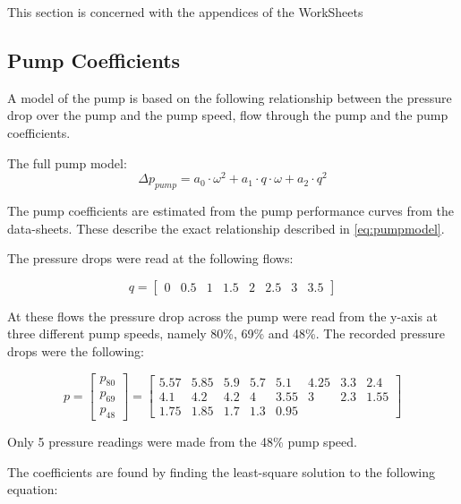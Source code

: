This section is concerned with the appendices of the WorkSheets

\subsection{Pump Coefficients} \label{ap:PumpCoef}

A model of the pump is based on the following relationship between the pressure drop over the pump and the pump speed, flow through the pump and the pump coefficients.

The full pump model:
\begin{equation} \label{eq:pumpmodel}
		\Delta p_{pump}  = a_0  \cdot \omega^2 + a_1 \cdot q \cdot \omega + a_2 \cdot q^2
\end{equation}

The pump coefficients are estimated from the pump performance curves from the data-sheets. These describe the exact relationship described in \cref{eq:pumpmodel}.

The pressure drops were read at the following flows:

\begin{equation}
	q = \begin{bmatrix}
		0 & 0.5 & 1 & 1.5 & 2 & 2.5 & 3 & 3.5 
	\end{bmatrix} 
\label{eq:pump_q}
\end{equation}

At these flows the pressure drop across the pump were read from the y-axis at three different pump speeds, namely 80\%, 69\% and 48\%. The recorded pressure drops were the following:

\begin{equation}
	p =  \begin{bmatrix}
		p_{80}\\
		p_{69} \\
		p_{48}
	\end{bmatrix}  = 
	\begin{bmatrix}
		5.57 & 5.85 & 5.9 & 5.7 & 5.1 & 4.25 & 3.3 & 2.4 \\
		4.1 & 4.2 & 4.2 & 4 & 3.55 & 3 & 2.3 & 1.55 \\
		1.75 & 1.85 & 1.7 & 1.3 & 0.95 &  &  &  
	\end{bmatrix} 
\label{eq:pump_p}
\end{equation}

Only 5 pressure readings were made from the 48\% pump speed.

The coefficients are found by finding the least-square solution to the following equation:

